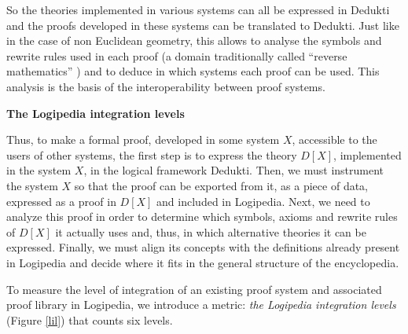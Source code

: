 So the theories implemented in various systems can all be expressed in
Dedukti and the proofs developed in these systems can be translated to
Dedukti. Just like in the case of non Euclidean geometry, this allows
to analyse the symbols and rewrite rules used in each proof
\cite{Thire18,Dowek17} (a domain traditionally called ``reverse
mathematics'' \cite{Friedman76,Simpson09}) and to deduce in which
systems each proof can be used.  This analysis is the basis of the
interoperability between proof systems.


\bigskip

\noindent
{\bf \Large The Logipedia integration levels}

\medskip

Thus, to make a formal proof, developed in some system $X$, accessible to
the users of other systems, the first step is to express the theory
$D[X]$, implemented in the system $X$, in the logical framework
  Dedukti.  Then, we must instrument the system $X$ so that the proof
can be exported from it, as a piece of data, expressed as a proof in
$D[X]$ and included in Logipedia. Next, we need to analyze this
proof in order to determine which symbols, axioms and rewrite rules of
$D[X]$ it actually uses and, thus, in which alternative theories it
can be expressed.  Finally, we must align its concepts with the
definitions already present in Logipedia and decide where it
fits in the general structure of the encyclopedia.

To measure the level of integration of an existing proof system and
associated proof library in Logipedia, we introduce a metric:
{\em the Logipedia integration levels} (Figure \ref{lil}) that
counts six levels.  

